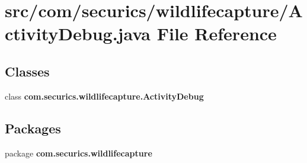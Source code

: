 \section{src/com/securics/wildlifecapture/\+Activity\+Debug.java File Reference}
\label{_activity_debug_8java}
\subsection*{Classes}
\begin{DoxyCompactItemize}
\item 
class {\bf com.\+securics.\+wildlifecapture.\+Activity\+Debug}
\end{DoxyCompactItemize}
\subsection*{Packages}
\begin{DoxyCompactItemize}
\item 
package {\bf com.\+securics.\+wildlifecapture}
\end{DoxyCompactItemize}
